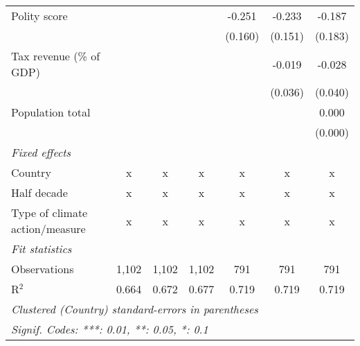 \begin{tabular}{lcccccc}
   Polity score                                                  &              &                &                & -0.251         & -0.233         & -0.187\\   
                                                                 &              &                &                & (0.160)        & (0.151)        & (0.183)\\   
   Tax revenue (\% of GDP)                                       &              &                &                &                & -0.019         & -0.028\\   
                                                                 &              &                &                &                & (0.036)        & (0.040)\\   
   Population total                                              &              &                &                &                &                & 0.000\\   
                                                                 &              &                &                &                &                & (0.000)\\   
   \emph{Fixed effects}\\
   Country                                                       & x            & x              & x              & x              & x              & x\\  
   Half decade                                                   & x            & x              & x              & x              & x              & x\\  
   Type of climate action/measure                                & x            & x              & x              & x              & x              & x\\  
   \midrule \emph{Fit statistics}\\
   Observations                                                  & 1,102        & 1,102          & 1,102          & 791            & 791            & 791\\  
   R$^2$                                                         & 0.664        & 0.672          & 0.677          & 0.719          & 0.719          & 0.719\\  
   \midrule
   \multicolumn{7}{l}{\emph{Clustered (Country) standard-errors in parentheses}}\\
   \multicolumn{7}{l}{\emph{Signif. Codes: ***: 0.01, **: 0.05, *: 0.1}}\\
\end{tabular}
\par\endgroup


